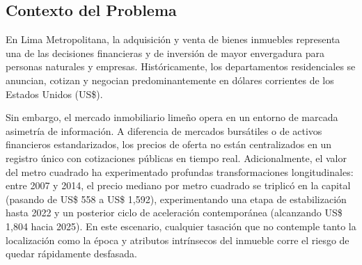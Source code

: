 \documentclass[11pt,a4paper]{article}
\begin{document}
\subsection{Contexto del Problema}
En Lima Metropolitana, la adquisición y venta de bienes inmuebles representa una de las decisiones financieras y de inversión de mayor envergadura para personas naturales y empresas. Históricamente, los departamentos residenciales se anuncian, cotizan y negocian predominantemente en dólares corrientes de los Estados Unidos (US\$). 

Sin embargo, el mercado inmobiliario limeño opera en un entorno de marcada asimetría de información. A diferencia de mercados bursátiles o de activos financieros estandarizados, los precios de oferta no están centralizados en un registro único con cotizaciones públicas en tiempo real. Adicionalmente, el valor del metro cuadrado ha experimentado profundas transformaciones longitudinales: entre 2007 y 2014, el precio mediano por metro cuadrado se triplicó en la capital (pasando de US\$ 558 a US\$ 1,592), experimentando una etapa de estabilización hasta 2022 y un posterior ciclo de aceleración contemporánea (alcanzando US\$ 1,804 hacia 2025). En este escenario, cualquier tasación que no contemple tanto la localización como la época y atributos intrínsecos del inmueble corre el riesgo de quedar rápidamente desfasada.
\end{document}
